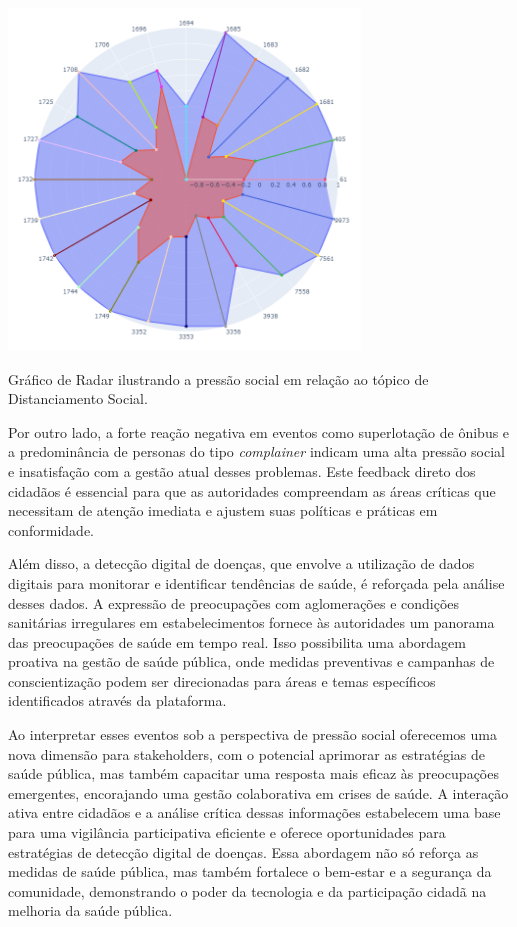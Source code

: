 \begin{quadro}[htb]
	\centering
	\includegraphics[width=0.7\textwidth]{images/social_barometer_social_distancing.png}
	\caption{Gráfico de Radar ilustrando a pressão social em relação ao tópico de Distanciamento Social.}
	\label{fig:social_barometer_social_distancing}
\end{quadro}

Por outro lado, a forte reação negativa em eventos como superlotação de ônibus e a predominância de personas do tipo \textit{complainer} indicam uma alta pressão social e insatisfação com a gestão atual desses problemas. Este feedback direto dos cidadãos é essencial para que as autoridades compreendam as áreas críticas que necessitam de atenção imediata e ajustem suas políticas e práticas em conformidade.

Além disso, a detecção digital de doenças, que envolve a utilização de dados digitais para monitorar e identificar tendências de saúde, é reforçada pela análise desses dados. A expressão de preocupações com aglomerações e condições sanitárias irregulares em estabelecimentos fornece às autoridades um panorama das preocupações de saúde em tempo real. Isso possibilita uma abordagem proativa na gestão de saúde pública, onde medidas preventivas e campanhas de conscientização podem ser direcionadas para áreas e temas específicos identificados através da plataforma.

Ao interpretar esses eventos sob a perspectiva de pressão social oferecemos uma nova dimensão para stakeholders, com o potencial aprimorar as estratégias de saúde pública, mas também capacitar uma resposta mais eficaz às preocupações emergentes, encorajando uma gestão colaborativa em crises de saúde. A interação ativa entre cidadãos e a análise crítica dessas informações estabelecem uma base para uma vigilância participativa eficiente e oferece oportunidades para estratégias de detecção digital de doenças. Essa abordagem não só reforça as medidas de saúde pública, mas também fortalece o bem-estar e a segurança da comunidade, demonstrando o poder da tecnologia e da participação cidadã na melhoria da saúde pública.

